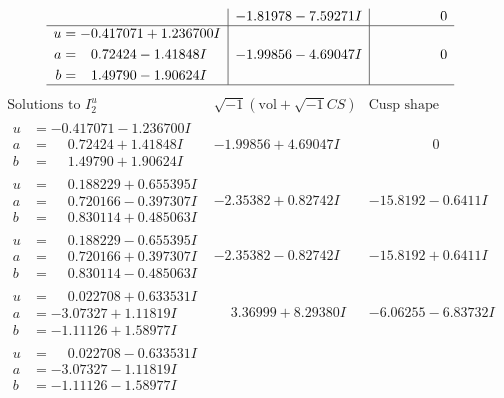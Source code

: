 \documentclass[1p]{elsarticle_modified}
\theoremstyle{definition}
\newcommand{\I}{\sqrt{-1}}
\begin{document}
$$\begin{array}{c|c|c}
 & -1.81978 - 7.59271 I & \phantom{-0.000000 } 0 \\ \hline\begin{aligned}
u &= -0.417071 + 1.236700 I \\
a &= \phantom{-}0.72424 - 1.41848 I \\
b &= \phantom{-}1.49790 - 1.90624 I\end{aligned}
 & -1.99856 - 4.69047 I & \phantom{-0.000000 } 0\\
 \hline 
 \end{array}$$\newpage$$\begin{array}{c|c|c}  
\text{Solutions to }I^u_{2}& \I (\text{vol} + \sqrt{-1}CS) & \text{Cusp shape}\\
 \hline 
\begin{aligned}
u &= -0.417071 - 1.236700 I \\
a &= \phantom{-}0.72424 + 1.41848 I \\
b &= \phantom{-}1.49790 + 1.90624 I\end{aligned}
 & -1.99856 + 4.69047 I & \phantom{-0.000000 } 0 \\ \hline\begin{aligned}
u &= \phantom{-}0.188229 + 0.655395 I \\
a &= \phantom{-}0.720166 - 0.397307 I \\
b &= \phantom{-}0.830114 + 0.485063 I\end{aligned}
 & -2.35382 + 0.82742 I & -15.8192 - 0.6411 I \\ \hline\begin{aligned}
u &= \phantom{-}0.188229 - 0.655395 I \\
a &= \phantom{-}0.720166 + 0.397307 I \\
b &= \phantom{-}0.830114 - 0.485063 I\end{aligned}
 & -2.35382 - 0.82742 I & -15.8192 + 0.6411 I \\ \hline\begin{aligned}
u &= \phantom{-}0.022708 + 0.633531 I \\
a &= -3.07327 + 1.11819 I \\
b &= -1.11126 + 1.58977 I\end{aligned}
 & \phantom{-}3.36999 + 8.29380 I & -6.06255 - 6.83732 I \\ \hline\begin{aligned}
u &= \phantom{-}0.022708 - 0.633531 I \\
a &= -3.07327 - 1.11819 I \\
b &= -1.11126 - 1.58977 I\end{aligned}

\end{array}$$
\end{document}
